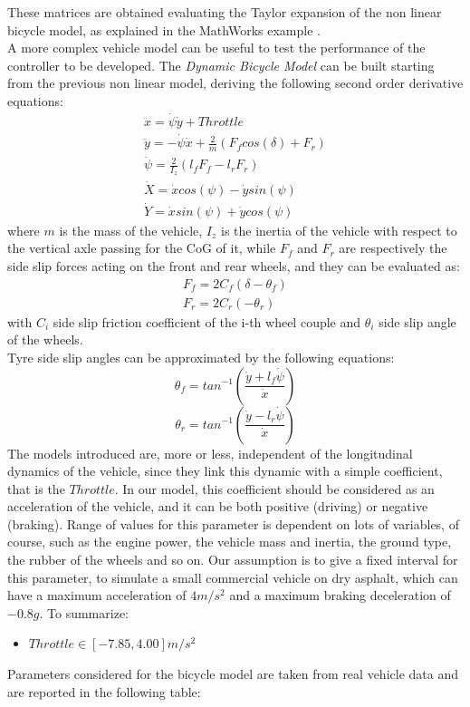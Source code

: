 These matrices are obtained evaluating the Taylor expansion of the non linear bicycle model, as explained in the MathWorks example \cite{StaticObs}.\\
A more complex vehicle model can be useful to test the performance of the controller to be developed. The \textit{Dynamic Bicycle Model} \cite{7225830} can be built starting from the previous non linear model, deriving the following second order derivative equations:
\begin{align}
    \ddot{x} = \dot{\psi}\dot{y} + Throttle\\
    \ddot{y} = -\dot{\psi}\dot{x} + \frac{2}{m}\left(F_fcos(\delta) + F_r\right)     \label{dynamic_equation}\\
    \ddot{\psi} = \frac{2}{I_z}\left(l_fF_f - l_rF_r\right)\\
    \dot{X} = \dot{x}cos(\psi) - \dot{y}sin(\psi)\\
    \dot{Y} = \dot{x}sin(\psi) + \dot{y}cos(\psi)
\end{align}
where $m$ is the mass of the vehicle, $I_z$ is the inertia of the vehicle with respect to the vertical axle passing for the CoG of it, while $F_f$ and $F_r$ are respectively the side slip forces acting on the front and rear wheels, and they can be evaluated as:
\begin{align}
    F_f = 2C_f\left(\delta - \theta_f\right)\\
    F_r = 2C_r\left(-\theta_r\right)
\end{align}
with $C_i$ side slip friction coefficient of the i-th wheel couple and $\theta_i$ side slip angle of the wheels.\\
Tyre side slip angles can be approximated by the following equations:
\begin{equation}
    \theta_f=tan^{-1}\left(\frac{\dot{y} + l_f\dot{\psi}}{\dot{x}}\right)
\end{equation}
\begin{equation}
    \theta_r=tan^{-1}\left(\frac{\dot{y} - l_r\dot{\psi}}{\dot{x}}\right)
\end{equation}
The models introduced are, more or less, independent of the longitudinal dynamics of the vehicle, since they link this dynamic with a simple coefficient, that is the $Throttle$. In our model, this coefficient should be considered as an acceleration of the vehicle, and it can be both positive (driving) or negative (braking). Range of values for this parameter is dependent on lots of variables, of course, such as the engine power, the vehicle mass and inertia, the ground type, the rubber of the wheels and so on. Our assumption is to give a fixed interval for this parameter, to simulate a small commercial vehicle on dry asphalt, which can have a maximum acceleration of $4 m/s^2$ and a maximum braking deceleration of $-0.8g$. To summarize:
\begin{itemize}
    \item $Throttle \in [-7.85, 4.00]m/s^2$
    \label{item:Throttle}
\end{itemize}
Parameters considered for the bicycle model are taken from real vehicle data \cite{10.2307/44733900} and are reported in the following table:

